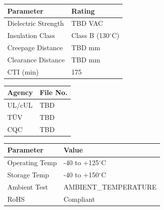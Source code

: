 \documentclass[10pt,a4paper]{article}
\begin{document}
\begin{minipage}[t]{0.32\textwidth}

\noindent{\normalsize\bfseries\textcolor{wurthred}{Safety \& Compliance}}
\vspace{1mm}

{\scriptsize
\begin{tabular}{|l|l|}
\hline
\rowcolor{tableheader}
\textbf{Parameter} & \textbf{Rating} \\
\hline
Dielectric Strength & TBD VAC \\
\hline
Insulation Class & Class B (130$^\circ$C) \\
\hline
Creepage Distance & TBD mm \\
\hline
Clearance Distance & TBD mm \\
\hline
CTI (min) & 175 \\
\hline
\end{tabular}
}

\vspace{2mm}

{\scriptsize
\begin{tabular}{|l|l|}
\hline
\rowcolor{tableheader}
\textbf{Agency} & \textbf{File No.} \\
\hline
UL/cUL & TBD \\
\hline
TÜV & TBD \\
\hline
CQC & TBD \\
\hline
\end{tabular}
}

\vspace{3mm}

\noindent{\normalsize\bfseries\textcolor{wurthred}{Environmental}}
\vspace{1mm}

{\scriptsize
\begin{tabular}{|l|l|}
\hline
\rowcolor{tableheader}
\textbf{Parameter} & \textbf{Value} \\
\hline
Operating Temp & -40 to +125$^\circ$C \\
\hline
Storage Temp & -40 to +150$^\circ$C \\
\hline
Ambient Test & {{AMBIENT_TEMPERATURE}} \\
\hline
RoHS & Compliant \\
\hline
\end{tabular}
}

\end{minipage}

\vspace{5mm}

\noindent{\normalsize\bfseries\textcolor{wurthred}{Common Mode Impedance vs. Frequency}}
\vspace{2mm}
\end{document}
